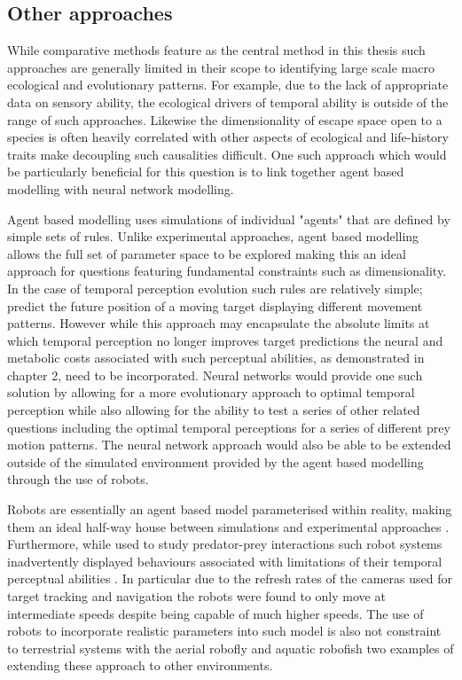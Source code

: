 \subsection{Other approaches}

While comparative methods feature as the central method in this thesis such approaches are generally limited in their scope to identifying large scale macro ecological and evolutionary patterns. For example, due to the lack of appropriate data on sensory ability, the ecological drivers of temporal ability is outside of the range of such approaches. Likewise the dimensionality of escape space open to a species is often heavily correlated with other aspects of ecological and life-history traits make decoupling such causalities difficult. One such approach which would be particularly beneficial for this question is to link together agent based modelling with neural network modelling. 


Agent based modelling uses simulations of individual "agents" that are defined by simple sets of rules. Unlike experimental approaches, agent based modelling allows the full set of parameter space to be explored making this an ideal approach for questions featuring fundamental constraints such as dimensionality. In the case of temporal perception evolution such rules are relatively simple; predict the future position of a moving target displaying different movement patterns. However while this approach may encapsulate the absolute limits at which temporal perception no longer improves target predictions the neural and metabolic costs associated with such perceptual abilities, as demonstrated in chapter 2, need to be incorporated. Neural networks would provide one such solution by allowing for a more evolutionary approach to optimal temporal perception while also allowing for the ability to test a series of other related questions including the optimal temporal perceptions for a series of different prey motion patterns. The neural network approach would also be able to be extended outside of the simulated environment provided by the agent based modelling through the use of robots. 


Robots are essentially an agent based model parameterised within reality, making them an ideal half-way house between simulations and experimental approaches \citep{floreano2010evolution}. Furthermore, while used to study predator-prey interactions such robot systems inadvertently displayed behaviours associated with limitations of their temporal perceptual abilities \citep{floreano2010evolution}. In particular due to the refresh rates of the cameras used for target tracking and navigation the robots were found to only move at intermediate speeds despite being capable of much higher speeds. The use of robots to incorporate realistic parameters into such model is also not constraint to terrestrial systems with the aerial robofly \citep{lauder2001aerodynamics} and aquatic robofish \citep{faria2010novel} two examples of extending these approach to other environments.


